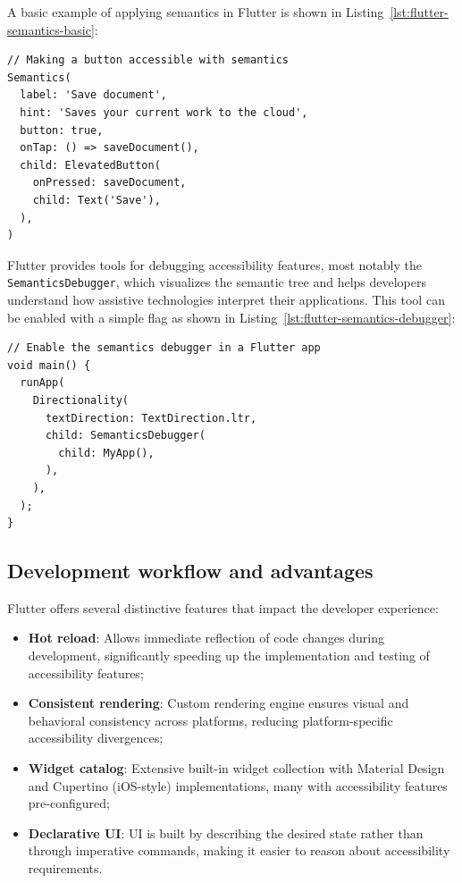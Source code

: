 A basic example of applying semantics in Flutter is shown in Listing~\ref{lst:flutter-semantics-basic}:

\begin{lstlisting}[style=DartStyle, caption=Basic Semantics implementation in Flutter, label=lst:flutter-semantics-basic]
// Making a button accessible with semantics
Semantics(
  label: 'Save document',
  hint: 'Saves your current work to the cloud',
  button: true,
  onTap: () => saveDocument(),
  child: ElevatedButton(
    onPressed: saveDocument,
    child: Text('Save'),
  ),
)
\end{lstlisting}

Flutter provides tools for debugging accessibility features, most notably the \\ \texttt{SemanticsDebugger}, which visualizes the semantic tree and helps developers understand how assistive technologies interpret their applications. This tool can be enabled with a simple flag as shown in Listing~\ref{lst:flutter-semantics-debugger}:

\begin{lstlisting}[style=DartStyle, caption=Using the SemanticsDebugger in Flutter, label=lst:flutter-semantics-debugger]
// Enable the semantics debugger in a Flutter app
void main() {
  runApp(
    Directionality(
      textDirection: TextDirection.ltr,
      child: SemanticsDebugger(
        child: MyApp(),
      ),
    ),
  );
}
\end{lstlisting}

\subsection{Development workflow and advantages}
Flutter offers several distinctive features that impact the developer experience:
\begin{itemize}
    \item \textbf{Hot reload}: Allows immediate reflection of code changes during development, significantly speeding up the implementation and testing of accessibility features;
    \item \textbf{Consistent rendering}: Custom rendering engine ensures visual and behavioral consistency across platforms, reducing platform-specific accessibility divergences;
    \item \textbf{Widget catalog}: Extensive built-in widget collection with Material Design and Cupertino (iOS-style) implementations, many with accessibility features pre-configured;
    \item \textbf{Declarative UI}: UI is built by describing the desired state rather than through imperative commands, making it easier to reason about accessibility requirements.
\end{itemize}

